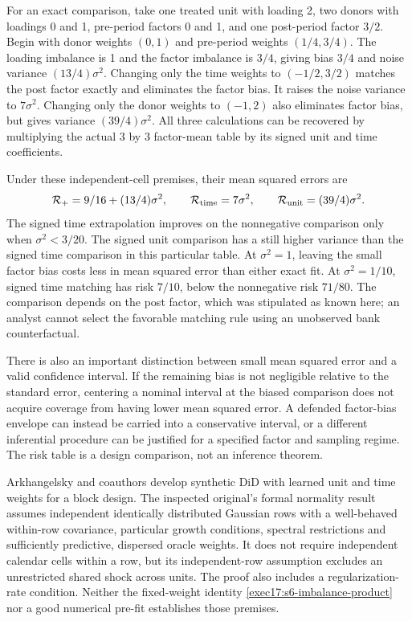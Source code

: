 For an exact comparison, take one treated unit with loading 2, two donors
with loadings 0 and 1, pre-period factors 0 and 1, and one post-period
factor $3/2$. Begin with donor weights $(0,1)$ and pre-period weights
$(1/4,3/4)$. The loading imbalance is 1 and the factor imbalance is
$3/4$, giving bias $3/4$ and noise variance $(13/4)\sigma^2$.
Changing only the time weights to $(-1/2,3/2)$ matches the post factor
exactly and eliminates the factor bias. It raises the noise variance to
$7\sigma^2$. Changing only the donor weights to $(-1,2)$ also
eliminates factor bias, but gives variance $(39/4)\sigma^2$.
All three calculations can be recovered by multiplying the actual
$3$ by $3$ factor-mean table by its signed unit and time coefficients.

Under these independent-cell premises, their mean squared errors are
\begin{equation}
 {\cal R}_{+}=9/16+(13/4)\sigma^2,\qquad
 {\cal R}_{\mathrm{time}}=7\sigma^2,\qquad
 {\cal R}_{\mathrm{unit}}=(39/4)\sigma^2.
 \label{exec17:s6-sdid-risk}
\end{equation}
The signed time extrapolation improves on the nonnegative comparison
only when $\sigma^2<3/20$. The signed unit comparison has a still
higher variance than the signed time comparison in this particular table.
At $\sigma^2=1$, leaving the small factor bias costs less in mean
squared error than either exact fit. At $\sigma^2=1/10$, signed time
matching has risk $7/10$, below the nonnegative risk $71/80$.
The comparison depends on the post factor, which was stipulated as known
here; an analyst cannot select the favorable matching rule using an
unobserved bank counterfactual.

There is also an important distinction between small mean squared error
and a valid confidence interval. If the remaining bias is not negligible
relative to the standard error, centering a nominal interval at the biased
comparison does not acquire coverage from having lower mean squared error.
A defended factor-bias envelope can instead be carried into a conservative
interval, or a different inferential procedure can be justified for a
specified factor and sampling regime. The risk table is a design
comparison, not an inference theorem.

Arkhangelsky and coauthors develop synthetic DiD with learned unit and
time weights for a block design. The inspected original's formal
normality result assumes independent identically distributed Gaussian
rows with a well-behaved within-row covariance, particular growth
conditions, spectral restrictions and sufficiently predictive, dispersed
oracle weights. It does not require independent calendar cells within a
row, but its independent-row assumption excludes an unrestricted shared
shock across units. The proof also includes a regularization-rate
condition. Neither the fixed-weight identity
\eqref{exec17:s6-imbalance-product} nor a good numerical pre-fit
establishes those premises.~\citep{synthdid2021}

